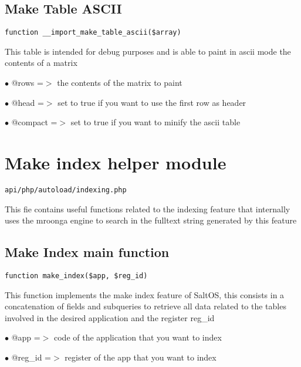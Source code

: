 \documentclass[a4paper]{book}
\begin{document}
\hypertarget{toc186}{}
\subsection{Make Table ASCII}

\begin{lstlisting}
function __import_make_table_ascii($array)
\end{lstlisting}

This table is intended for debug purposes and is able to paint in ascii
mode the contents of a matrix

\begin{compactitem}
\item[\color{myblue}$\bullet$] @rows    =$>$ the contents of the matrix to paint
\item[\color{myblue}$\bullet$] @head    =$>$ set to true if you want to use the first row as header
\item[\color{myblue}$\bullet$] @compact =$>$ set to true if you want to minify the ascii table
\end{compactitem}

\hypertarget{toc187}{}
\section{Make index helper module}

\begin{lstlisting}
api/php/autoload/indexing.php
\end{lstlisting}

This fie contains useful functions related to the indexing feature that internally uses the
mroonga engine to search in the fulltext string generated by this feature

\hypertarget{toc188}{}
\subsection{Make Index main function}

\begin{lstlisting}
function make_index($app, $reg_id)
\end{lstlisting}

This function implements the make index feature of SaltOS, this consists
in a concatenation of fields and subqueries to retrieve all data related to
the tables involved in the desired application and the register reg\_id

\begin{compactitem}
\item[\color{myblue}$\bullet$] @app    =$>$ code of the application that you want to index
\item[\color{myblue}$\bullet$] @reg\_id =$>$ register of the app that you want to index
\end{compactitem}
\end{document}
